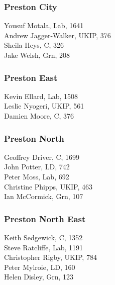\documentclass[a4paper,openany,10pt]{book}
\begin{document}
\subsubsection*{Preston City}



Yousuf Motala, Lab, 1641\\
{Andrew Jagger-Walker}, UKIP, 376\\
Sheila Heys, C, 326\\
Jake Welsh, Grn, 208\\


\subsubsection*{Preston East}



Kevin Ellard, Lab, 1508\\
Leslie Nyogeri, UKIP, 561\\
Damien Moore, C, 376\\


\subsubsection*{Preston North}



Geoffrey Driver, C, 1699\\
John Potter, LD, 742\\
Peter Moss, Lab, 692\\
Christine Phipps, UKIP, 463\\
Ian McCormick, Grn, 107\\


\subsubsection*{Preston North East}



Keith Sedgewick, C, 1352\\
Steve Ratcliffe, Lab, 1191\\
Christopher Rigby, UKIP, 784\\
Peter Mylroie, LD, 160\\
Helen Disley, Grn, 123\\
\end{document}
